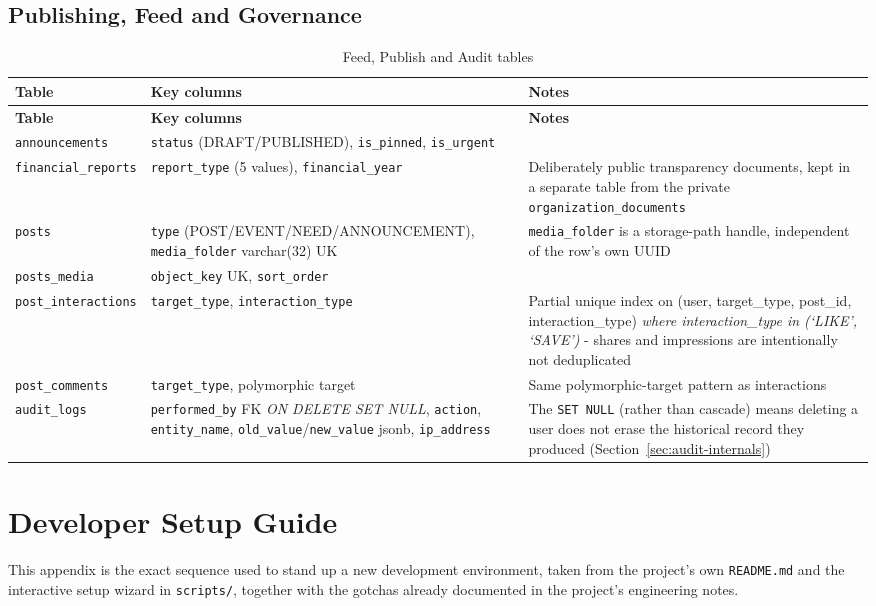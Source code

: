 \section{Publishing, Feed and Governance}
\begin{longtable}{|>{\raggedright\arraybackslash}p{}|>{\raggedright\arraybackslash}p{}|>{\raggedright\arraybackslash}p{}|}
\caption{Feed, Publish and Audit tables}\\\hline
\textbf{Table} & \textbf{Key columns} & \textbf{Notes}\\\hline
\endfirsthead\hline\textbf{Table} & \textbf{Key columns} & \textbf{Notes}\\\hline\endhead
\texttt{announcements} & \texttt{status} (DRAFT/PUBLISHED), \texttt{is\_pinned}, \texttt{is\_urgent} & \\\hline
\texttt{financial\_\allowbreak reports} & \texttt{report\_type} (5 values), \texttt{financial\_year} & Deliberately public transparency documents, kept in a separate table from the private \texttt{organization\_\allowbreak documents}\\\hline
\texttt{posts} & \texttt{type} (POST/\allowbreak EVENT/\allowbreak NEED/\allowbreak ANNOUNCEMENT), \texttt{media\_folder} varchar(32) UK & \texttt{media\_folder} is a storage-path handle, independent of the row's own UUID\\\hline
\texttt{posts\_media} & \texttt{object\_key} UK, \texttt{sort\_order} & \\\hline
\texttt{post\_\allowbreak interactions} & \texttt{target\_type}, \texttt{interaction\_type} & Partial unique index on (user, target\_type, post\_id, interaction\_type) \emph{where interaction\_type in (`LIKE', `SAVE')} - shares and impressions are intentionally not deduplicated\\\hline
\texttt{post\_comments} & \texttt{target\_type}, polymorphic target & Same polymorphic-target pattern as interactions\\\hline
\texttt{audit\_logs} & \texttt{performed\_by} FK \emph{ON DELETE SET NULL}, \texttt{action}, \texttt{entity\_name}, \texttt{old\_value}/\texttt{new\_value} jsonb, \texttt{ip\_address} & The \texttt{SET NULL} (rather than cascade) means deleting a user does not erase the historical record they produced (Section~\ref{sec:audit-internals})\\\hline
\end{longtable}

\endgroup

\chapter{Developer Setup Guide}
\label{app:setup}
\label{sec:setup-guide}
This appendix is the exact sequence used to stand up a new development environment, taken from the project's own \texttt{README.md} and the interactive setup wizard in \texttt{scripts/}, together with the gotchas already documented in the project's engineering notes.

